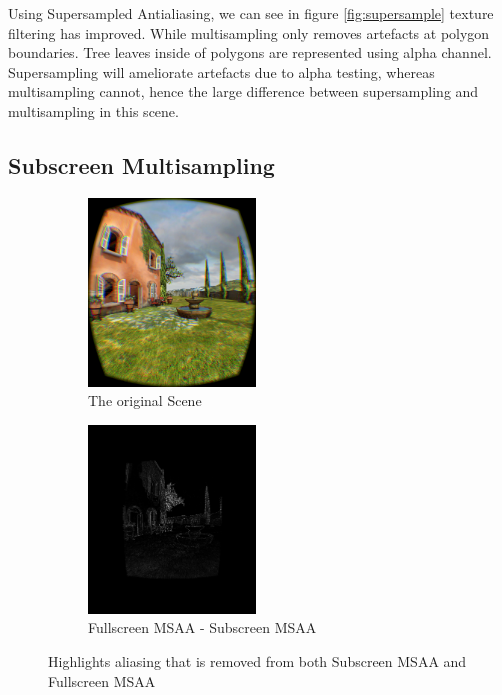 \documentclass[12pt,a4paper,twoside,openright]{report}
\begin{document}
Using Supersampled Antialiasing, we can see in figure \ref{fig:supersample} texture filtering has improved. While multisampling only removes artefacts at polygon boundaries. Tree leaves inside of polygons are represented using alpha channel. Supersampling will ameliorate artefacts due to alpha testing, whereas multisampling cannot, hence the large difference between supersampling and multisampling in this scene.

\clearpage

\subsection{Subscreen Multisampling}

\begin{figure}[tbh]

\begin{subfigure}{0.5\textwidth}
\includegraphics[width=0.9\linewidth, height=5cm]{figs/noantialiasing.png}
\caption{The original Scene}
\label{fig:subim2}
\end{subfigure}
\begin{subfigure}{0.5\textwidth}
\includegraphics[width=0.9\linewidth, height=5cm]{figs/fullscreenminussubscreenmsaa.png} 
\caption{Fullscreen MSAA - Subscreen MSAA}
\label{fig:subim1}
\end{subfigure}
 
\caption{Highlights aliasing that is removed from both Subscreen MSAA and Fullscreen MSAA}
\label{fig:multisample}
\end{figure}
\end{document}

